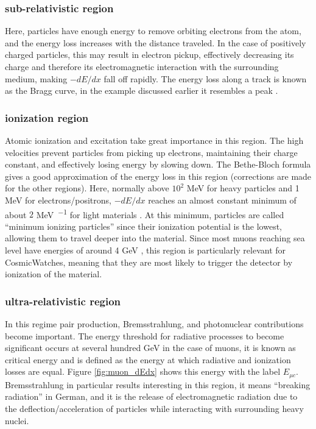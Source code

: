 \subsubsection{sub-relativistic region}

Here, particles have enough energy to remove orbiting electrons from the atom, and the energy loss increases with the distance traveled. In the case of positively charged particles, this may result in electron pickup, effectively decreasing its charge and therefore its electromagnetic interaction with the surrounding medium, making $-dE/dx$ fall off rapidly. The energy loss along a track is known as the Bragg curve, in the example discussed earlier it resembles a peak \cite{knoll2010radiation}.

\subsubsection{ionization region}

Atomic ionization and excitation take great importance in this region. The high velocities prevent particles from picking up electrons, maintaining their charge constant, and effectively losing energy by slowing down. The Bethe-Bloch formula gives a good approximation of the energy loss in this region (corrections are made for the other regions). Here, normally above $10^2$ MeV for heavy particles and 1 MeV for electrons/positrons, $-dE/dx$ reaches an almost constant minimum of about $2$ \unit{\mega\eV\per{\g\cm\squared}} for light materials \cite[p.~32]{knoll2010radiation}. At this minimum, particles are called ``minimum ionizing particles'' since their ionization potential is the lowest, allowing them to travel deeper into the material. Since most muons reaching sea level have energies of around 4 \unit{\giga\eV} \cite[p.~380]{ReviewOfParticlePhysics}, this region is particularly relevant for CosmicWatches, meaning that they are most likely to trigger the detector by ionization of the material.

\subsubsection{ultra-relativistic region}

In this regime pair production, Bremsstrahlung, and photonuclear contributions become important. The energy threshold for radiative processes to become significant occurs at several hundred \unit{\giga\eV} in the case of muons, it is known as critical energy and is defined as the energy at which radiative and ionization losses are equal. Figure \ref{fig:muon_dEdx} shows this energy with the label $E_{\mu c}$. Bremsstrahlung in particular results interesting in this region, it means ``breaking radiation'' in German, and it is the release of electromagnetic radiation due to the deflection/acceleration of particles while interacting with surrounding heavy nuclei.

